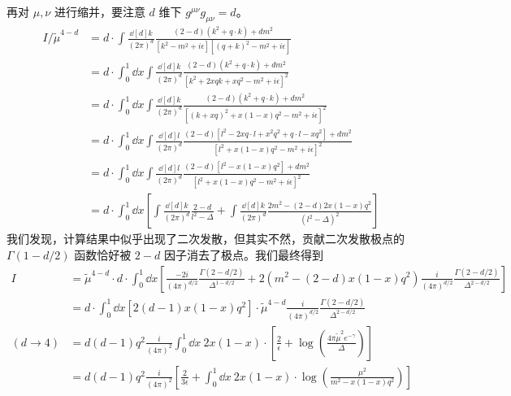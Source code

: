 再对 $\mu,\nu$ 进行缩并，要注意 $d$ 维下 $g^{\mu\nu}g_{\mu\nu}=d$。
\begin{equation}
\begin{aligned}
	I / \tilde{\mu}^{4-d} &= d \cdot\int \frac{\dd[d]{k}}{(2\pi)^d} \frac{(2-d)(k^2+q\cdot k) + d m^2}{[k^2-m^2+i\epsilon][(q+k)^2-m^2+i\epsilon]}\\
    &=d\cdot\int_0^1\dd x \int\frac{\dd[d]{k}}{(2\pi)^d} \frac{(2-d)(k^2+q\cdot k) + d m^2}{[k^2+2xqk+xq^2-m^2+i\epsilon]^2}\\
    &=d\cdot\int_0^1\dd x\int  \frac{\dd[d]{k}}{(2\pi)^d} \frac{(2-d)(k^2+q\cdot k)+d m^2}{[ (k+xq)^2 +x(1- x)q^2-m^2+i\epsilon ]^2}\\
    &=d\cdot\int_0^1\dd x\int  \frac{\dd[d]{l}}{(2\pi)^d} \frac{(2-d)\left[l^2 -2xq\cdot l +x^2q^2 +q\cdot l-x q^2\right]+d m^2}{[ l^2 +x(1- x)q^2-m^2+i\epsilon ]^2}\\
    &=d\cdot\int_0^1\dd x\int  \frac{\dd[d]{l}}{(2\pi)^d} \frac{(2-d)\left[l^2 -x(1-x)q^2\right]+d m^2}{[ l^2 +x(1- x)q^2-m^2+i\epsilon ]^2}\\
    &=d\cdot \int_0^1\dd x\left[\int\frac{\dd[d]{k}}{(2\pi)^d}\frac{2-d}{l^2-\Delta}+\int \frac{\dd[d]{k}}{(2\pi)^d}\frac{2m^2-(2-d)2x(1-x)q^2}{(l^2-\Delta)^2}\right]
\end{aligned}
\end{equation}
我们发现，计算结果中似乎出现了二次发散，但其实不然，贡献二次发散极点的 $\Gamma(1-d/2)$ 函数恰好被 $2-d$ 因子消去了极点。我们最终得到
\begin{equation}\label{eq_qedlop_4}
\begin{aligned}
I&=\tilde{\mu}^{4-d}\cdot d\cdot\int_0^1\dd x \left[\frac{-2i}{(4\pi)^{d/2}}\frac{\Gamma(2-d/2)}{\Delta^{1-d/2}}+2(m^2-(2-d)x(1-x)q^2)\frac{i}{(4\pi)^{d/2}}\frac{\Gamma(2-d/2)}{\Delta^{2-d/2}}\right]\\
&= d \cdot \int_0^1\dd x [2(d-1)x(1-x)q^2] \cdot \tilde{\mu}^{4-d}\frac{i}{(4\pi)^{d/2}}\frac{\Gamma(2-d/2)}{\Delta^{2-d/2}}\\
(d\rightarrow 4)&=d(d-1)q^2 \frac{i}{(4\pi)^2}\int_0^1 \dd x\ 2x(1-x)\cdot\left[ \frac{2}{\epsilon}+\log\left(\frac{4\pi \tilde{\mu}^2 e^{-\gamma}}{\Delta}\right) \right]\\
&=d(d-1)q^2 \frac{i}{(4\pi)^2}\left[\frac{2}{3\epsilon}+\int_0^1 \dd x\ 2x(1-x)\cdot\log\left(\frac{\mu^2}{m^2-x(1-x)q^2}\right)\right]
\end{aligned}
\end{equation}
